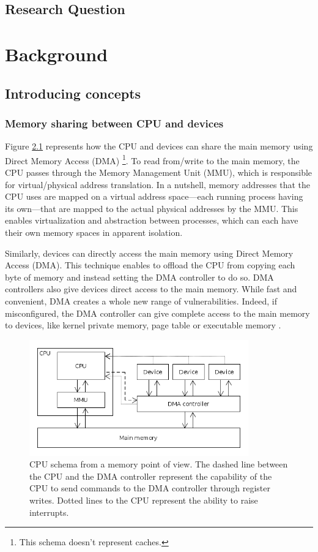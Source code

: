 \documentclass{kththesis}
\begin{document}
\section{Research Question}

\chapter{Background}

\section{Introducing concepts}

\subsection{Memory sharing between CPU and devices}

Figure \ref{cpu-memory-schema} represents how the CPU and devices can share the
main memory using Direct Memory Access (DMA) \footnote{This schema doesn't
represent caches.}. To read from/write to the main memory, the CPU passes
through the Memory Management Unit (MMU), which is responsible for
virtual/physical address translation. In a nutshell, memory addresses that the
CPU uses are mapped on a virtual address space---each running process having its
own---that are mapped to the actual physical addresses by the MMU. This enables
virtualization and abstraction between processes, which can each have their own
memory spaces in apparent isolation.

Similarly, devices can directly access the main memory using Direct Memory
Access (DMA). This technique enables to offload the CPU from copying each byte
of memory and instead setting the DMA controller to do so. DMA controllers also
give devices direct access to the main memory. While fast and convenient, DMA
creates a whole new range of vulnerabilities. Indeed, if misconfigured, the DMA
controller can give complete access to the main memory to devices, like kernel
private memory, page table or executable memory \cite{schwarz_formal_2014}.

\begin{figure}[!t]
	\includegraphics[height=5cm]{figures/cpu-memory-schema.png}
	\centering
	\caption{CPU schema from a memory point of view. The dashed line between the
		CPU and the DMA controller represent the capability of the CPU to send
		commands to the DMA controller through register writes. Dotted lines to
	the CPU represent the ability to raise interrupts.}
	\label{cpu-memory-schema}
\end{figure}
\end{document}
